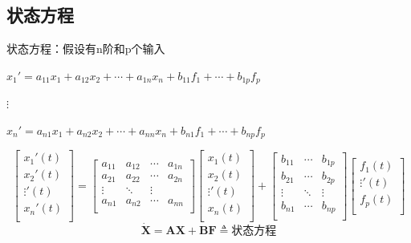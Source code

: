\documentclass[UTF8]{ctexart}
\begin{document}
\subsection{状态方程}
状态方程：假设有n阶和p个输入 \par
$x_1'=a_{11}x_1+a_{12}x_2+\cdots +a_{1n}x_n+b_{11}f_1+\cdots +b_{1p}f_p$ \par
$\vdots $ \par
$x_n'=a_{n1}x_1+a_{n2}x_2+\cdots +a_{nn}x_n+b_{n1}f_1+\cdots +b_{np}f_p$ \par
\begin{equation}
        \left[   
           \begin{matrix}
           x_1'(t) \\
           x_2'(t) \\
           \vdots'(t) \\
           x_n'(t) \\
           \end{matrix}
         \right]
         =  \left[   
           \begin{matrix}
           a_{11} &  a_{12} & \cdots & a_{1n}  \\
           a_{21} &  a_{22} & \cdots & a_{2n}  \\
           \vdots  &  \ddots   & \vdots   \\
           a_{n1} &  a_{n2} & \cdots & a_{nn}  \\
           \end{matrix}
         \right]
         \left[   
          \begin{matrix}
          x_1(t) \\
          x_2(t) \\
          \vdots'(t) \\
          x_n(t) \\
          \end{matrix}
        \right]
        +  \left[   
          \begin{matrix}
          b_{11}  & \cdots & b_{1p}  \\
          b_{21}  & \cdots & b_{2p}  \\
          \vdots  & \ddots& \vdots   \\
          b_{n1} & \cdots & b_{np}  \\
          \end{matrix}
        \right]
        \left[   
          \begin{matrix}
          f_1(t) \\
          \vdots'(t) \\
          f_p(t) \\
          \end{matrix}
        \right]
        \nonumber
       \end{equation}
\begin{equation}
  \dot{\bm{X}} = \bm{AX} + \bm{BF}\triangleq \text{状态方程}
  \nonumber
\end{equation}
\end{document}
